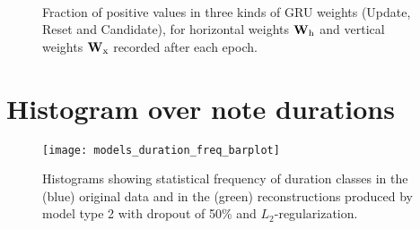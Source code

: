 \begin{figure}[h!]
    \centering
    \\
    \caption{Fraction of positive values in three kinds of GRU weights (Update, Reset and Candidate), for  horizontal weights $\bm{\mathrm{W}}_{\text{h}}$ and  vertical weights $\bm{\mathrm{W}}_{\text{x}}$ recorded after each epoch.
 	}
    \label{fig:model_1:weights_pos}
\end{figure}



\clearpage
\section{Histogram over note durations} %
\label{sec:histogram_over_note_durations}
\begin{figure*}
    \centering
    \texttt{[image: models\_duration\_freq\_barplot]}
    \caption{Histograms showing statistical frequency of duration classes in the (blue) original data and in the (green) reconstructions produced by model type 2 with dropout of 50\% and $L_2$-regularization.}
    \label{fig:histogram:duration}
\end{figure*}
